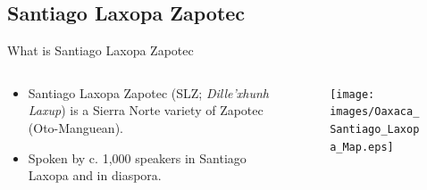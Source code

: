 \documentclass[professionalfonts]{beamer}
\begin{document}

\subsection{Santiago Laxopa Zapotec}

\begin{frame}{What is Santiago Laxopa Zapotec}
  \begin{columns}
    \begin{column}{0.33\textwidth}
      \begin{itemize}
        \item Santiago Laxopa Zapotec (SLZ; \textit{Dille'xhunh Laxup}) is a Sierra Norte variety of Zapotec (Oto-Manguean).
        \item Spoken by c. 1,000 speakers in Santiago Laxopa and in diaspora.
      \end{itemize}
    \end{column}
    \begin{column}{0.67\textwidth}
      \begin{figure}
        \centering
        \texttt{[image: images/Oaxaca\_Santiago\_Laxopa\_Map.eps]}
      \end{figure}
    \end{column}
  \end{columns}
\end{frame}
\end{document}
